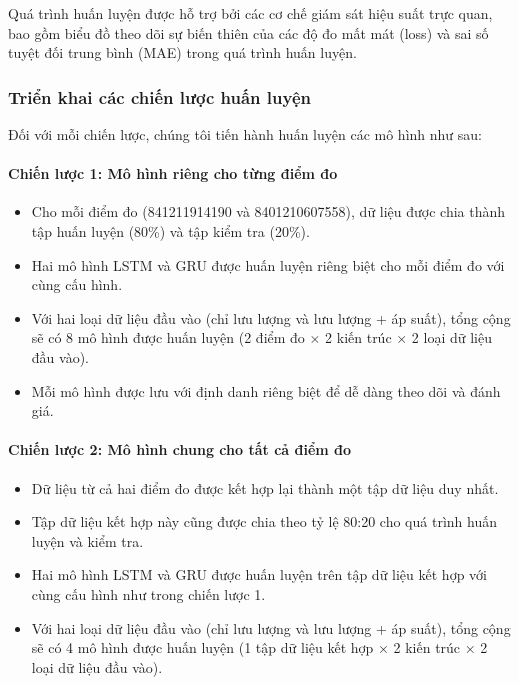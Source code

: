 Quá trình huấn luyện được hỗ trợ bởi các cơ chế giám sát hiệu suất trực quan, bao gồm biểu đồ theo dõi sự biến thiên của các độ đo mất mát (loss) và sai số tuyệt đối trung bình (MAE) trong quá trình huấn luyện.

\subsubsection{Triển khai các chiến lược huấn luyện}

Đối với mỗi chiến lược, chúng tôi tiến hành huấn luyện các mô hình như sau:

\paragraph{Chiến lược 1: Mô hình riêng cho từng điểm đo}
\begin{itemize}
    \item Cho mỗi điểm đo (841211914190 và 8401210607558), dữ liệu được chia thành tập huấn luyện (80\%) và tập kiểm tra (20\%).
    \item Hai mô hình LSTM và GRU được huấn luyện riêng biệt cho mỗi điểm đo với cùng cấu hình.
    \item Với hai loại dữ liệu đầu vào (chỉ lưu lượng và lưu lượng + áp suất), tổng cộng sẽ có 8 mô hình được huấn luyện (2 điểm đo × 2 kiến trúc × 2 loại dữ liệu đầu vào).
    \item Mỗi mô hình được lưu với định danh riêng biệt để dễ dàng theo dõi và đánh giá.
\end{itemize}

\paragraph{Chiến lược 2: Mô hình chung cho tất cả điểm đo}
\begin{itemize}
    \item Dữ liệu từ cả hai điểm đo được kết hợp lại thành một tập dữ liệu duy nhất.
    \item Tập dữ liệu kết hợp này cũng được chia theo tỷ lệ 80:20 cho quá trình huấn luyện và kiểm tra.
    \item Hai mô hình LSTM và GRU được huấn luyện trên tập dữ liệu kết hợp với cùng cấu hình như trong chiến lược 1.
    \item Với hai loại dữ liệu đầu vào (chỉ lưu lượng và lưu lượng + áp suất), tổng cộng sẽ có 4 mô hình được huấn luyện (1 tập dữ liệu kết hợp × 2 kiến trúc × 2 loại dữ liệu đầu vào).
\end{itemize}

